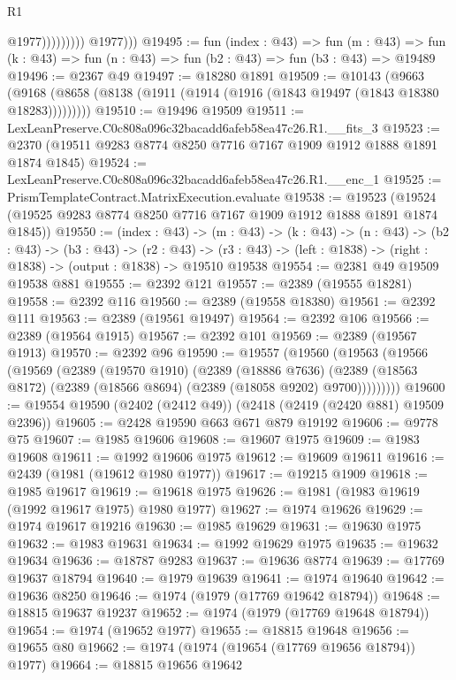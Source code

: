 \begin{lexlean}{R1}
\begin{coremodule}
                            @1977)))))))))
          @1977)))
@19495 := fun (index : @43) =>
  fun (m : @43) => fun (k : @43) => fun (n : @43) => fun (b2 : @43) => fun (b3 : @43) => @19489
@19496 := @2367 @49
@19497 := @18280 @1891
@19509 := @10143
    (@9663 (@9168 (@8658 (@8138 (@1911 (@1914 (@1916 (@1843 @19497 (@1843 @18380 @18283)))))))))
@19510 := @19496 @19509
@19511 := LexLeanPreserve.C0c808a096c32bacadd6afeb58ea47c26.R1.__fits_3
@19523 := @2370 (@19511 @9283 @8774 @8250 @7716 @7167 @1909 @1912 @1888 @1891 @1874 @1845)
@19524 := LexLeanPreserve.C0c808a096c32bacadd6afeb58ea47c26.R1.__enc_1
@19525 := PrismTemplateContract.MatrixExecution.evaluate
@19538 := @19523 (@19524 (@19525 @9283 @8774 @8250 @7716 @7167 @1909 @1912 @1888 @1891 @1874 @1845))
@19550 := (index : @43) ->
  (m : @43) ->
  (k : @43) ->
  (n : @43) ->
  (b2 : @43) ->
  (b3 : @43) ->
  (r2 : @43) -> (r3 : @43) -> (left : @1838) -> (right : @1838) -> (output : @1838) -> @19510 @19538
@19554 := @2381 @49 @19509 @19538 @881
@19555 := @2392 @121
@19557 := @2389 (@19555 @18281)
@19558 := @2392 @116
@19560 := @2389 (@19558 @18380)
@19561 := @2392 @111
@19563 := @2389 (@19561 @19497)
@19564 := @2392 @106
@19566 := @2389 (@19564 @1915)
@19567 := @2392 @101
@19569 := @2389 (@19567 @1913)
@19570 := @2392 @96
@19590 := @19557
    (@19560
      (@19563
        (@19566
          (@19569
            (@2389
              (@19570 @1910)
              (@2389
                (@18886 @7636)
                (@2389 (@18563 @8172) (@2389 (@18566 @8694) (@2389 (@18058 @9202) @9700)))))))))
@19600 := @19554 @19590 (@2402 (@2412 @49)) (@2418 (@2419 (@2420 @881) @19509 @2396))
@19605 := @2428 @19590 @663 @671 @879 @19192
@19606 := @9778 @75
@19607 := @1985 @19606
@19608 := @19607 @1975
@19609 := @1983 @19608
@19611 := @1992 @19606 @1975
@19612 := @19609 @19611
@19616 := @2439 (@1981 (@19612 @1980 @1977))
@19617 := @19215 @1909
@19618 := @1985 @19617
@19619 := @19618 @1975
@19626 := @1981 (@1983 @19619 (@1992 @19617 @1975) @1980 @1977)
@19627 := @1974 @19626
@19629 := @1974 @19617 @19216
@19630 := @1985 @19629
@19631 := @19630 @1975
@19632 := @1983 @19631
@19634 := @1992 @19629 @1975
@19635 := @19632 @19634
@19636 := @18787 @9283
@19637 := @19636 @8774
@19639 := @17769 @19637 @18794
@19640 := @1979 @19639
@19641 := @1974 @19640
@19642 := @19636 @8250
@19646 := @1974 (@1979 (@17769 @19642 @18794))
@19648 := @18815 @19637 @19237
@19652 := @1974 (@1979 (@17769 @19648 @18794))
@19654 := @1974 (@19652 @1977)
@19655 := @18815 @19648
@19656 := @19655 @80
@19662 := @1974 (@1974 (@19654 (@17769 @19656 @18794)) @1977)
@19664 := @18815 @19656 @19642

\end{coremodule}
\end{lexlean}
